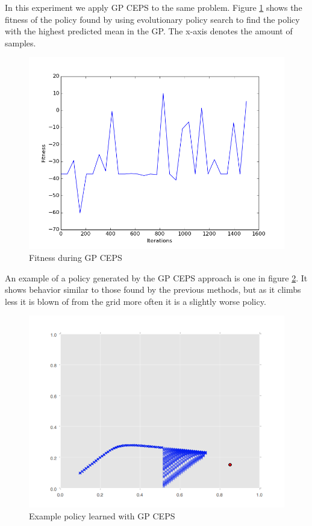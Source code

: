In this experiment we apply GP CEPS to the same problem. Figure \ref{Fitness during GP CEPS} shows the fitness of the policy found by using evolutionary policy search to find the policy with the highest predicted mean in the GP. The x-axis denotes the amount of samples. 

\begin{figure}[ht]
  \centering
  \includegraphics[scale=0.5]{images/GPCEPS_True.png}
  \caption{Fitness during GP CEPS}\label{Fitness during GP CEPS}
\end{figure}

An example of a policy generated by the GP CEPS approach is one in figure \ref{gp_policy}. It shows behavior similar to those found by the previous methods, but as it climbs less it is blown of from the grid more often it is a slightly worse policy. 

\begin{figure}[ht]
  \centering
  \includegraphics[scale=0.5]{images/GPCEPS_policy.png}
  \caption{Example policy learned with GP CEPS}\label{gp_policy}
\end{figure}

